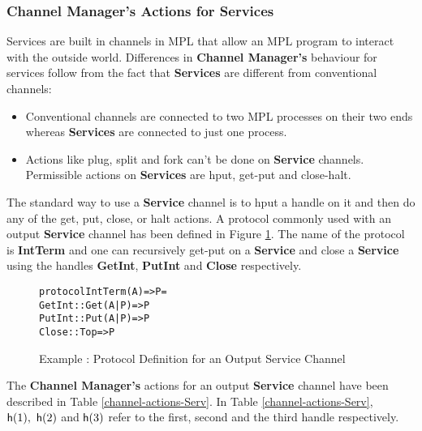 \documentclass[11pt]{article}
\newcommand{\<}{\langle}
\renewcommand{\>}{\rangle}
\begin{document}
\subsubsection{Channel Manager's Actions for Services}{\label{channel-man-serv}}
Services are built in channels in MPL that allow an MPL program to interact with the outside world. Differences in {\bf Channel Manager's} behaviour for services follow from the fact that {\bf Services} are different from conventional channels:
\begin{itemize}
  \item Conventional channels are connected to two MPL processes on their two ends whereas {\bf Services} are connected to just one process.
  \item Actions like {\sf plug}, {\sf split} and {\sf fork} can't be done on {\bf Service} channels. Permissible actions on {\bf Services} are {\sf hput}, {\sf get-put} and {\sf close-halt}.
\end{itemize}
The standard way to use a {\bf Service} channel is to {\sf hput} a handle on it and then do any of the {\sf get, put, close, or halt} actions. A protocol commonly used with an output {\bf Service} channel has been defined in Figure \ref {AMPL:ProtExample}. The name of the protocol is {\bf IntTerm} and one can recursively {\sf get-put} on a {\bf Service} and {\sf close} a {\bf Service} using the handles {\bf GetInt}, {\bf PutInt} and {\bf Close} respectively.
\begin{figure}[!h]
\begin{alltt}


                    protocol IntTerm (A) => P =
                        GetInt   :: Get (A|P) => P 
                        PutInt   :: Put (A|P) => P
                        Close    :: Top       => P  

\end{alltt}
\caption{Example : Protocol Definition for an Output Service Channel}
\label {AMPL:ProtExample}
\end{figure}
The {\bf Channel Manager's} actions for an output {\bf Service} channel have been described in Table \ref {channel-actions-Serv}. In Table \ref {channel-actions-Serv}, ${\sf h}(1),~{\sf h}(2)$ and ${\sf h}(3)$ refer to the first, second and the third handle respectively. 
\end{document}

